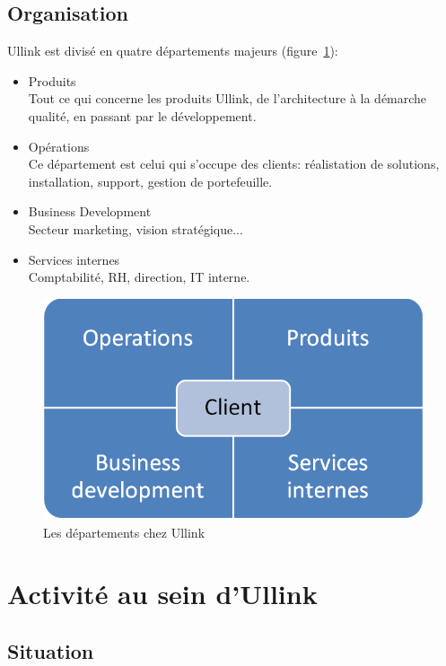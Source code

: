 \documentclass[a4paper, 12pt]{article}
\begin{document}
\subsection{Organisation}

Ullink est divisé en quatre départements majeurs (figure~\ref{depts_ullink}):

\begin{itemize}
\item Produits\\
Tout ce qui concerne les produits Ullink, de l'architecture à la démarche qualité, en passant par le développement.

\item Opérations\\
Ce département est celui qui s'occupe des clients: réalistation de solutions, installation, support, gestion de portefeuille.

\item Business Development\\
Secteur marketing, vision stratégique...

\item Services internes\\
Comptabilité, RH, direction, IT interne.
\end{itemize}

\begin{figure}
\includegraphics[width=\textwidth]{orga_deps_client.png}
\caption{Les départements chez Ullink}
\label{depts_ullink}
\end{figure}

\section{Activité au sein d'Ullink}

\subsection{Situation}
\end{document}
